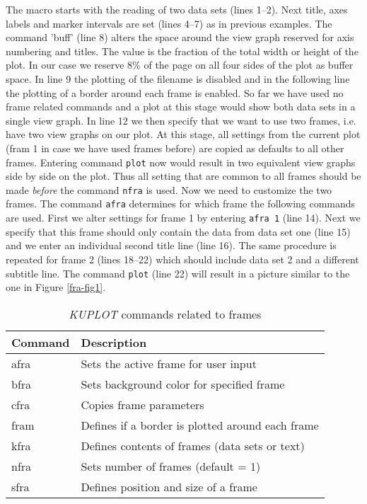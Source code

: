 The macro starts with the reading of two data sets (lines 1--2).
Next title, axes labels and marker intervals are set (lines 4--7) as
in previous examples. The command 'buff' (line 8) alters the space
around the view graph reserved for axis numbering and titles. The
value is the fraction of the total width or height of the plot. In
our case we reserve 8\% of the page on all four sides of the plot as
buffer space. In line 9 the plotting of the filename is disabled and
in the following line the plotting of a border around each frame is
enabled. So far we have used no frame related commands and a plot at
this stage would show both data sets in a single view graph. In line
12 we then specify that we want to use two frames, i.e. have two
view graphs on our plot. At this stage, all settings from the
current plot (fram 1 in case we have used frames before) are copied
as defaults to all other frames. Entering command {\tt plot} now
would result in two equivalent view graphs side by side on the plot.
Thus all setting that are common to all frames should be made {\it
before} the command {\tt nfra} is used. Now we need to customize the
two frames. The command {\tt afra} determines for which frame the
following commands are used. First we alter settings for frame 1 by
entering {\tt afra 1} (line 14). Next we specify that this frame
should only contain the data from data set one (line 15) and we
enter an individual second title line (line 16). The same procedure
is repeated for frame 2 (lines 18--22) which should include data set
2 and a different subtitle line. The command {\tt plot} (line 22)
will result in a picture similar to the one in Figure
\ref{fra-fig1}.

\begin{table}[!tbh]
\centering
\begin{tabularx}{\textwidth}{|l|X|}
  \hline
  {\bf Command} & {\bf Description} \\
  \hline\hline
   afra & Sets the active frame for user input \\
   bfra & Sets background color for specified frame \\
   cfra & Copies frame parameters \\
   fram & Defines if a border is plotted around each frame \\
   kfra & Defines contents of frames (data sets or text) \\
   nfra & Sets number of frames (default = 1) \\
   sfra & Defines position and size of a frame \\
  \hline
\end{tabularx}
\caption{\label{fra-tab1}{\it KUPLOT} commands related to frames}
\end{table}

